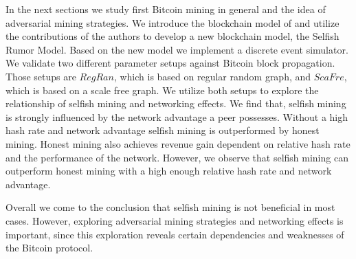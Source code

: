 In the next sections we study first Bitcoin mining in general and the idea of adversarial mining strategies. We introduce the blockchain model of  and utilize the contributions of the authors to develop a new blockchain model, the Selfish Rumor Model.
Based on the new model we implement a discrete event simulator. We validate two different parameter setups against Bitcoin block propagation. Those setups are $RegRan$, which is based on regular random graph, and $ScaFre$, which is based on a scale free graph. We utilize both setups to explore the relationship of selfish mining and networking effects. We find that, selfish mining is strongly influenced by the network advantage a peer possesses. Without a high hash rate and network advantage selfish mining is outperformed by honest mining. Honest mining also achieves revenue gain dependent on relative hash rate and the performance of the network. However, we observe that selfish mining can outperform honest mining with a high enough relative hash rate and network advantage.

Overall we come to the conclusion that selfish mining is not beneficial in most cases. However, exploring adversarial mining strategies and networking effects is important, since this exploration reveals certain dependencies and weaknesses of the Bitcoin protocol.





